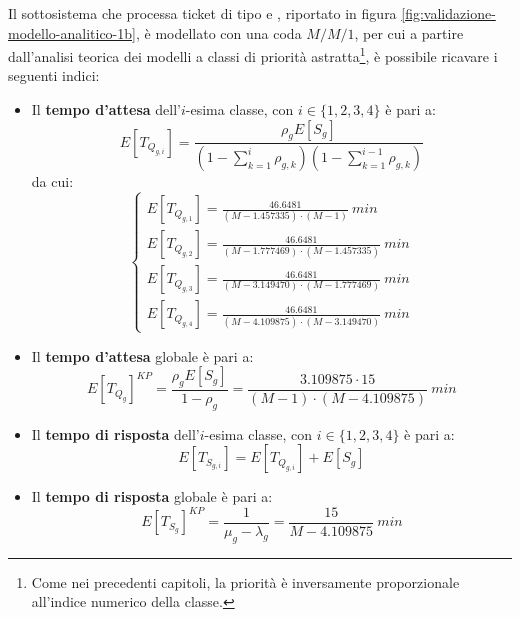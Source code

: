 Il sottosistema che processa ticket di tipo \uo{} e \pp{}, riportato in figura \ref{fig:validazione-modello-analitico-1b}, è modellato con una coda $M/M/1$, per cui a partire dall'analisi teorica dei modelli a classi di priorità astratta\footnote{\label{note:validazione-1}Come nei precedenti capitoli, la priorità è inversamente proporzionale all'indice numerico della classe.}, è possibile ricavare i seguenti indici:
\begin{itemize}
\item Il \textbf{tempo d'attesa} dell'$i$-esima classe, con $i\in\lbrace 1, 2, 3, 4\rbrace$ è pari a:
\begin{equation}
E[T_{Q_{g,i}}] = \frac{\rho_g E[S_g]}{\left(1- \sum_{k=1}^{i} \rho_{g,k}\right)\left(1- \sum_{k=1}^{i-1} \rho_{g,k}\right)}
\end{equation}
da cui:
\begin{equation}
\begin{cases}
E[T_{Q_{g,1}}] = \frac{46.6481}{(M-1.457335)\cdot(M-1)}\ min \\[1.5em]
E[T_{Q_{g,2}}] = \frac{46.6481}{(M-1.777469)\cdot(M-1.457335)}\ min \\[1em]
E[T_{Q_{g,3}}] = \frac{46.6481}{(M-3.149470)\cdot(M-1.777469)}\ min \\[1em]
E[T_{Q_{g,4}}] = \frac{46.6481}{(M-4.109875)\cdot(M-3.149470)}\ min
\end{cases}
\end{equation}
\item Il \textbf{tempo d'attesa} globale è pari a:
\begin{equation}
E[T_{Q_g}]^{KP} = \frac{\rho_g E[S_g]}{1-\rho_g} = \frac{3.109875\cdot 15}{(M-1)\cdot (M-4.109875)}\ min
\end{equation}
\item Il \textbf{tempo di risposta} dell'$i$-esima classe, con $i\in\lbrace 1, 2, 3, 4\rbrace$ è pari a:
\begin{equation}
E[T_{S_{g,i}}] = E[T_{Q_{g,i}}] + E[S_g]
\end{equation}
\item Il \textbf{tempo di risposta} globale è pari a:
\begin{equation}
E[T_{S_g}]^{KP} = \frac{1}{\mu_g - \lambda_g} = \frac{15}{M-4.109875}\ min
\end{equation}
\end{itemize}

